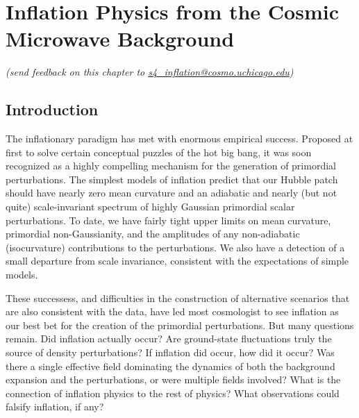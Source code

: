  
\chapter{Inflation Physics from the Cosmic Microwave Background}



\begin{center}
{\small {\it (send feedback on this chapter to \href{mailto:s4\_inflation@cosmo.uchicago.edu}{s4\_inflation@cosmo.uchicago.edu})}}
\end{center}



\section{Introduction}

The inflationary paradigm has met with enormous empirical success. Proposed at first to solve certain conceptual puzzles of the hot big bang, it was soon recognized as a highly compelling mechanism for the generation of primordial perturbations. The simplest models of inflation predict that our Hubble patch should have nearly zero mean curvature and an adiabatic and nearly (but not quite) scale-invariant spectrum of highly Gaussian primordial scalar perturbations. To date, we have fairly tight upper limits on mean curvature, primordial non-Gaussianity, and the amplitudes of any non-adiabatic (isocurvature) contributions to the perturbations. We also have a detection of a small departure from scale invariance, consistent with the expectations of simple models. 

These successess, and difficulties in the construction of alternative scenarios that are also consistent with the data, have led most cosmologist to see inflation as our best bet for the creation of the primordial perturbations. But many questions remain. Did inflation actually occur? Are ground-state fluctuations truly the source of density perturbations? If inflation did occur, how did it occur? Was there a single effective field dominating the dynamics of both the background expansion and the perturbations, or were multiple fields involved? What is the connection of inflation physics to the rest of physics? What observations could falsify inflation, if any?

